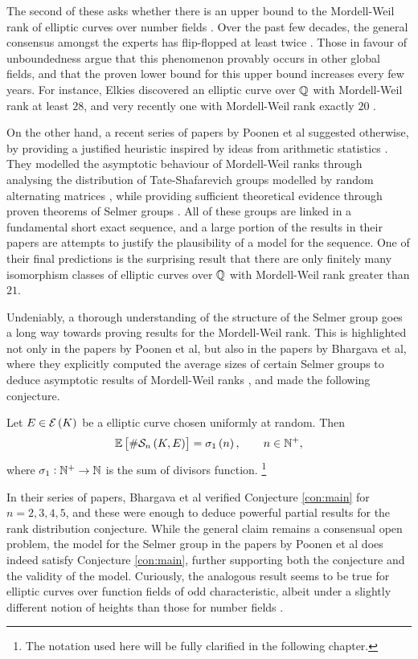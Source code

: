 The second of these asks whether there is an upper bound to the Mordell-Weil rank of elliptic curves over number fields \cite[Conjecture 10.1]{Sil09}. Over the past few decades, the general consensus amongst the experts has flip-flopped at least twice \cite[Section 3]{PPVW19}. Those in favour of unboundedness argue that this phenomenon provably occurs in other global fields, and that the proven lower bound for this upper bound increases every few years. For instance, Elkies discovered an elliptic curve over $ \mathbb{Q} $ with Mordell-Weil rank at least $ 28 $, and very recently one with Mordell-Weil rank exactly $ 20 $ \cite{EK20}.

On the other hand, a recent series of papers by Poonen et al suggested otherwise, by providing a justified heuristic inspired by ideas from arithmetic statistics \cite{Poo17}. They modelled the asymptotic behaviour of Mordell-Weil ranks through analysing the distribution of Tate-Shafarevich groups modelled by random alternating matrices \cite{PPVW19}, while providing sufficient theoretical evidence through proven theorems of Selmer groups \cite{BKLPR15, PR12}. All of these groups are linked in a fundamental short exact sequence, and a large portion of the results in their papers are attempts to justify the plausibility of a model for the sequence. One of their final predictions is the surprising result that there are only finitely many isomorphism classes of elliptic curves over $ \mathbb{Q} $ with Mordell-Weil rank greater than $ 21 $.

\pagebreak

Undeniably, a thorough understanding of the structure of the Selmer group goes a long way towards proving results for the Mordell-Weil rank. This is highlighted not only in the papers by Poonen et al, but also in the papers by Bhargava et al, where they explicitly computed the average sizes of certain Selmer groups to deduce asymptotic results of Mordell-Weil ranks \cite{BS13a, BS13b}, and made the following conjecture.

\begin{conjecture}[{\cite[Conjecture 4]{BS13a}}]
\label{con:main}
Let $ E \in \EEE\br{K} $ be a elliptic curve chosen uniformly at random. Then
$$ \EE\sbr{\#\Sel[n]} = \sigma_1\br{n}, \qquad n \in \NN^+, $$
where $ \sigma_1 : \mathbb{N}^+ \to \mathbb{N} $ is the sum of divisors function. \footnote{The notation used here will be fully clarified in the following chapter.}
\end{conjecture}

In their series of papers, Bhargava et al verified Conjecture \ref{con:main} for $ n = 2, 3, 4, 5 $, and these were enough to deduce powerful partial results for the rank distribution conjecture. While the general claim remains a consensual open problem, the model for the Selmer group in the papers by Poonen et al does indeed satisfy Conjecture \ref{con:main}, further supporting both the conjecture and the validity of the model. Curiously, the analogous result seems to be true for elliptic curves over function fields of odd characteristic, albeit under a slightly different notion of heights than those for number fields \cite[Theorem 1.2]{Lan20}.

